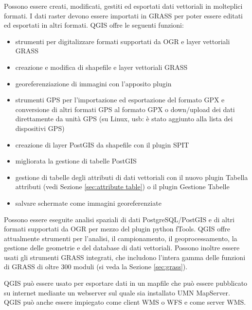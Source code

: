 
Possono essere creati, modificati, gestiti ed esportati dati vettoriali
in molteplici formati. I dati raster devono essere importati in GRASS
per poter essere editati ed esportati in altri formati. QGIS offre
le seguenti funzioni:
\begin{itemize}
\item strumenti per digitalizzare formati supportati da OGR e layer vettoriali GRASS
\item creazione e modifica di shapefile e layer vettoriali GRASS 
\item georeferenziazione di immagini con l'apposito plugin 
\item strumenti GPS per l'importazione ed esportazione del formato GPX e conversione di altri formati GPS
al formato GPX o down/upload dei dati direttamente da unità GPS (su Linux, usb: è stato aggiunto 
alla lista dei dispositivi GPS)
\item creazione di layer PostGIS da shapefile con il plugin SPIT
\item migliorata la gestione di tabelle PostGIS
\item gestione di tabelle degli attributi di dati vettoriali con il nuovo plugin Tabella attributi (vedi Sezione 
\ref{sec:attribute table}) o il plugin Gestione Tabelle
\item salvare schermate come immagini georeferenziate
\end{itemize}


Possono essere eseguite analisi spaziali di dati PostgreSQL/PostGIS e di altri
formati supportati da OGR per mezzo del plugin python fTools. QGIS
offre attualmente strumenti per l'analisi, il campionamento, il geoprocessamento,
la gestione delle geometrie e del database di dati vettoriali. Possono
inoltre essere usati gli strumenti GRASS integrati, che includono
l'intera gamma delle funzioni di GRASS di oltre 300 moduli (si veda la Sezione \ref{sec:grass}).


QGIS può essere usato per esportare dati in un mapfile che può essere
pubblicato su internet mediante un webserver sul quale sia installato
UMN MapServer. QGIS può anche essere impiegato come client WMS o
WFS e come server WMS. 


